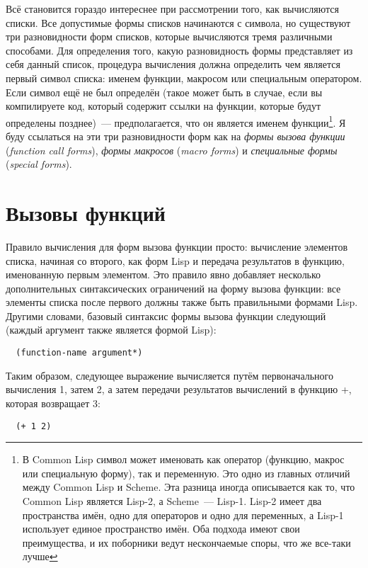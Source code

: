 Всё становится гораздо интереснее при рассмотрении того, как вычисляются списки. Все
допустимые формы списков начинаются с символа, но существуют три разновидности форм
списков, которые вычисляются тремя различными способами. Для определения того, какую
разновидность формы представляет из себя данный список, процедура вычисления должна
определить чем является первый символ списка: именем функции, макросом или специальным
оператором. Если символ ещё не был определён (такое может быть в случае, если вы
компилируете код, который содержит ссылки на функции, которые будут определены позднее)~---
предполагается, что он является именем функции\footnote{В Common Lisp символ может
  именовать как оператор (функцию, макрос или специальную форму), так и переменную. Это
  одно из главных отличий между Common Lisp и Scheme. Эта разница иногда описывается как
  то, что Common Lisp является Lisp-2, а Scheme~--- Lisp-1. Lisp-2 имеет два пространства
  имён, одно для операторов и одно для переменных, а Lisp-1 использует единое пространство
  имён. Оба подхода имеют свои преимущества, и их поборники ведут нескончаемые споры, что
  же все-таки лучше}. Я буду ссылаться на эти три разновидности форм как на \textit{формы
  вызова функции} (\textit{function call forms}), \textit{формы макросов} (\textit{macro
  forms}) и \textit{специальные формы} (\textit{special forms}).

\section{Вызовы функций}

Правило вычисления для форм вызова функции просто: вычисление элементов списка, начиная со
второго, как форм Lisp и передача результатов в функцию, именованную первым элементом. Это
правило явно добавляет несколько дополнительных синтаксических ограничений на форму вызова
функции: все элементы списка после первого должны также быть правильными формами
Lisp. Другими словами, базовый синтаксис формы вызова функции следующий (каждый аргумент
также является формой Lisp):

\begin{lstlisting}
  (function-name argument*)
\end{lstlisting}

Таким образом, следующее выражение вычисляется путём первоначального вычисления 1, затем
2, а затем передачи результатов вычислений в функцию +, которая возвращает 3:

\begin{lstlisting}
  (+ 1 2)
\end{lstlisting}


